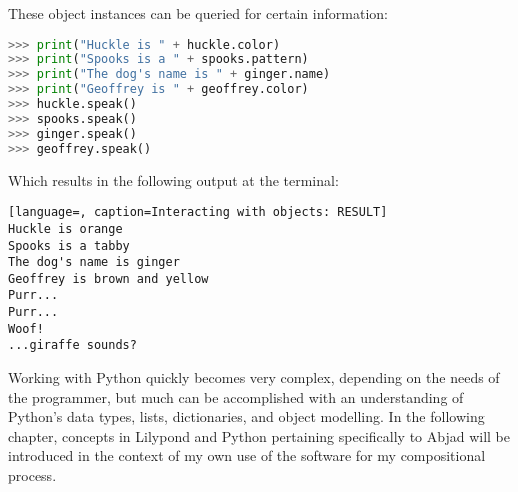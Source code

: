These object instances can be queried for certain information:

\singlespace
\begin{lstlisting}[language=Python, caption=Interacting with objects]
>>> print("Huckle is " + huckle.color)
>>> print("Spooks is a " + spooks.pattern)
>>> print("The dog's name is " + ginger.name)
>>> print("Geoffrey is " + geoffrey.color)
>>> huckle.speak()
>>> spooks.speak()
>>> ginger.speak()
>>> geoffrey.speak()
\end{lstlisting}
\doublespace

Which results in the following output at the terminal:

\singlespace
\begin{lstlisting}[language=, caption=Interacting with objects: RESULT]
Huckle is orange
Spooks is a tabby
The dog's name is ginger
Geoffrey is brown and yellow
Purr...
Purr...
Woof!
...giraffe sounds?
\end{lstlisting}
\doublespace

Working with Python quickly becomes very complex, depending on the needs of the programmer, but much can be accomplished with an understanding of Python's data types, lists, dictionaries, and object modelling. In the following chapter, concepts in Lilypond and Python pertaining specifically to Abjad will be introduced in the context of my own use of the software for my compositional process.

\singlespace